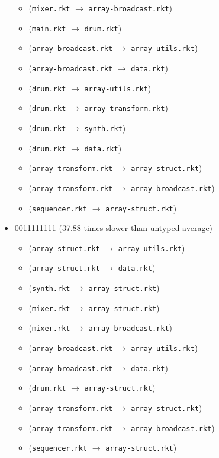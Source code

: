 \documentclass{article}
\newcommand{\mono}[1]{\texttt{#1}}
\begin{document}
\begin{itemize}
\begin{itemize}
  \item (\mono{mixer.rkt} $\rightarrow$ \mono{array-broadcast.rkt})
  \item (\mono{main.rkt} $\rightarrow$ \mono{drum.rkt})
  \item (\mono{array-broadcast.rkt} $\rightarrow$ \mono{array-utils.rkt})
  \item (\mono{array-broadcast.rkt} $\rightarrow$ \mono{data.rkt})
  \item (\mono{drum.rkt} $\rightarrow$ \mono{array-utils.rkt})
  \item (\mono{drum.rkt} $\rightarrow$ \mono{array-transform.rkt})
  \item (\mono{drum.rkt} $\rightarrow$ \mono{synth.rkt})
  \item (\mono{drum.rkt} $\rightarrow$ \mono{data.rkt})
  \item (\mono{array-transform.rkt} $\rightarrow$ \mono{array-struct.rkt})
  \item (\mono{array-transform.rkt} $\rightarrow$ \mono{array-broadcast.rkt})
  \item (\mono{sequencer.rkt} $\rightarrow$ \mono{array-struct.rkt})
  \end{itemize}
\item 0011111111 (37.88 times slower than untyped average)
  \begin{itemize}
  \item (\mono{array-struct.rkt} $\rightarrow$ \mono{array-utils.rkt})
  \item (\mono{array-struct.rkt} $\rightarrow$ \mono{data.rkt})
  \item (\mono{synth.rkt} $\rightarrow$ \mono{array-struct.rkt})
  \item (\mono{mixer.rkt} $\rightarrow$ \mono{array-struct.rkt})
  \item (\mono{mixer.rkt} $\rightarrow$ \mono{array-broadcast.rkt})
  \item (\mono{array-broadcast.rkt} $\rightarrow$ \mono{array-utils.rkt})
  \item (\mono{array-broadcast.rkt} $\rightarrow$ \mono{data.rkt})
  \item (\mono{drum.rkt} $\rightarrow$ \mono{array-struct.rkt})
  \item (\mono{array-transform.rkt} $\rightarrow$ \mono{array-struct.rkt})
  \item (\mono{array-transform.rkt} $\rightarrow$ \mono{array-broadcast.rkt})
  \item (\mono{sequencer.rkt} $\rightarrow$ \mono{array-struct.rkt})
  \end{itemize}

\end{itemize}
\end{document}
